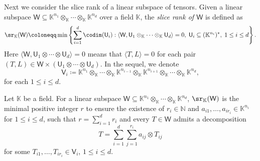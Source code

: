 Next we consider the slice rank of a linear subspace of tensors.  Given a linear subspace $\mathsf{W} \subseteq \mathbb{K}^{n_1} \otimes_{\mathbb{K}}  \cdots \otimes_{\mathbb{K}}   \mathbb{K}^{n_d}$ over a field $\mathbb{K}$,  the \emph{slice rank of $\mathsf{W}$} is defined as 
\begin{equation}\label{eq:SRW}
\sr_{\mathbb{K}}(\mathsf{W}) \coloneqq \min \left\lbrace \sum_{i=1}^{d} \codim( \mathsf{U}_{i}):  \langle \mathsf{W}, \mathsf{U}_{1} \otimes_{\mathbb{K}}  \cdots \otimes_{\mathbb{K}}  \mathsf{U}_{d}\rangle=0,\; \mathsf{U}_i \subseteq (\mathbb{K}^{n_i})^{\ast},\;1 \le i  \le d \right\rbrace.
\end{equation}
Here $\langle \mathsf{W}, \mathsf{U}_{1}\otimes \cdots\otimes  \mathsf{U}_{d}\rangle = 0$ means that $\langle T,  L \rangle = 0$ for each pair $(T, L) \in \mathsf{W} \times \left( \mathsf{U}_{1}\otimes \cdots\otimes \mathsf{U}_{d} \right)$.  In the sequel,  we denote 
\begin{equation}\label{eq:Vi}
\mathsf{V}_i \coloneqq \mathbb{K}^{n_1} \otimes_{\mathbb{K}}  \cdots \otimes_{\mathbb{K}}  \mathbb{K}^{n_{i-1}} \otimes_{\mathbb{K}}  \mathbb{K}^{n_{i+1}} \otimes_{\mathbb{K}}  \cdots \otimes_{\mathbb{K}}  \mathbb{K}^{n_d},
\end{equation}
for each $1 \le i \le d$.
\begin{lemma}\label{lem4-8}
Let $\mathbb{K}$ be a field.  For a linear subspace $\mathsf{W} \subseteq \mathbb{K}^{n_1} \otimes_{\mathbb{K}}  \cdots \otimes_{\mathbb{K}}  \mathbb{K}^{n_d}$,  $\sr_{\mathbb{K}}(\mathsf{W})$ is the minimal positive integer $r$ to ensure the existence of $r_i \in \mathbb{N}$ and $a_{i1},\dots,  a_{ir_i} \in \mathbb{K}^{n_i}$ for $1 \le i \le d$,  such that $r = \sum_{i=1}^d r_i$ and every $T \in \mathsf{W}$ admits a decomposition
\begin{equation}\label{lem4-8:eq1}
T = \sum_{i=1}^d  \sum_{j=1}^{r_i} a_{ij} \otimes T_{ij}
\end{equation}
for some $T_{i1},\dots,  T_{ir_i} \in \mathsf{V}_i$,  $1 \le i \le d$.  
\end{lemma}
